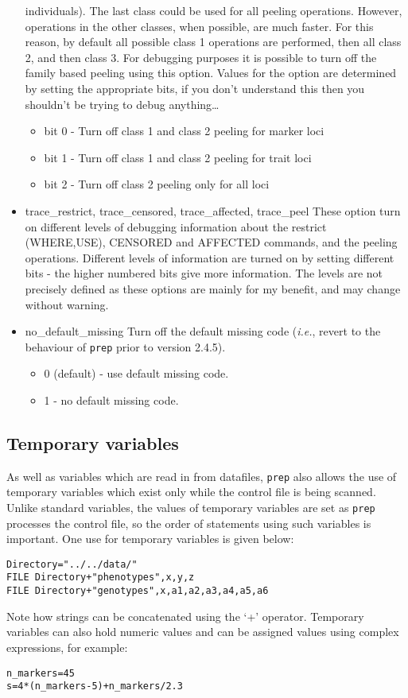 \documentclass[10pt,a4paper]{article}
\newcommand{\IE}{\textit{i.e.},\xspace}
\newcommand{\Prep}{\texttt{prep}\xspace}
\begin{document}
\begin{itemize}
	  individuals).  The last class could be used for all peeling operations.
	  However, operations in the other classes, when possible, are much
	  faster.  For this reason, by default all possible class 1 operations
	  are performed, then all class 2, and then class 3.  For debugging
	  purposes it is possible to turn off the family based peeling using this
	  option.  Values for the option are determined by setting the
	  appropriate bits, if you don't understand this then you shouldn't be
	  trying to debug anything{\ldots}
	  \begin{itemize}
		 \item bit 0 - Turn off class 1 and class 2 peeling for marker loci
		 \item bit 1 - Turn off class 1 and class 2 peeling for trait loci
		 \item bit 2 - Turn off class 2 peeling only for all loci
	  \end{itemize}
	\item trace\_restrict, trace\_censored, trace\_affected, trace\_peel
	  These option turn on different levels of debugging information about
	  the restrict (WHERE,USE), CENSORED and AFFECTED commands, and the
	  peeling operations.  Different levels of information are turned on by
	  setting different bits - the higher numbered bits give more
	  information. The levels are not precisely defined as these options are
	  mainly for my benefit, and may change without warning.
	\item no\_default\_missing
	  Turn off the default missing code (\IE revert to the behaviour of \Prep
	  prior to version 2.4.5).
	 \begin{itemize}
		\item 0 (default) - use default missing code.
		\item 1 - no default missing code.
	 \end{itemize}
\end{itemize}
\subsection{Temporary variables}
As well as variables which are read in from datafiles, \Prep also allows the
use of temporary variables which exist only while the control file is being
scanned.  Unlike standard variables, the values of temporary variables are
set as \Prep processes the control file, so the order of statements using
such variables is important.  One use for temporary variables is given below:
\begin{verbatim}
Directory="../../data/"
FILE Directory+"phenotypes",x,y,z
FILE Directory+"genotypes",x,a1,a2,a3,a4,a5,a6
\end{verbatim}
Note how strings can be concatenated using the `+' operator. Temporary
variables can also hold numeric values and can be assigned values using
complex expressions, for example:
\begin{verbatim}
n_markers=45
s=4*(n_markers-5)+n_markers/2.3
\end{verbatim}
\end{document}
